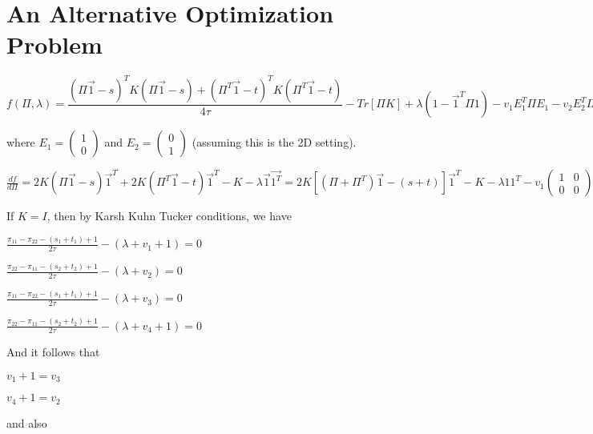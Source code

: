 \section{An Alternative Optimization Problem}
$f(\Pi,\lambda)=\dfrac{(\Pi\vec{1}-s)^{T}K(\Pi\vec{1}-s)+(\Pi^{T}\vec{1}-t)^{T}K(\Pi^{T}\vec{1}-t)}{4\tau}-Tr[\Pi K]+\lambda(1-\vec{1}^{T}\Pi1)-v_{1}E_{1}^{T}\Pi E_{1}-v_{2}E_{2}^{T}\Pi E_{1}-v_{3}E_{1}^{T}\Pi E_{2}-v_{4}E_{2}^{T}\Pi E_{2}$

where $E_{1}=\left(\begin{array}{c}
1\\
0
\end{array}\right)$ and $E_{2}=\left(\begin{array}{c}
0\\
1
\end{array}\right)$ (assuming this is the 2D setting).

$\frac{df}{d\Pi}=2K(\Pi\vec{1}-s)\vec{1}^{T}+2K(\Pi^{T}\vec{1}-t)\vec{1}^{T}-K-\lambda\vec{1}\vec{1^{T}}=2K[(\Pi+\Pi^{T})\vec{1}-(s+t)]\vec{1}^{T}-K-\lambda11^{T}-v_{1}\left(\begin{array}{cc}
1 & 0\\
0 & 0
\end{array}\right)-v_{2}\left(\begin{array}{cc}
0 & 0\\
1 & 0
\end{array}\right)-v_{3}\left(\begin{array}{cc}
0 & 1\\
0 & 0
\end{array}\right)-v_{4}\left(\begin{array}{cc}
0 & 0\\
0 & 1
\end{array}\right)$

If $K=I$, then by Karsh Kuhn Tucker conditions, we have 

$\frac{\pi_{11}-\pi_{22}-(s_{1}+t_{1})+1}{2\tau}-(\lambda+v_{1}+1)=0$

$\frac{\pi_{22}-\pi_{11}-(s_{2}+t_{2})+1}{2\tau}-(\lambda+v_{2})=0$

$\frac{\pi_{11}-\pi_{22}-(s_{1}+t_{1})+1}{2\tau}-(\lambda+v_{3})=0$

$\frac{\pi_{22}-\pi_{11}-(s_{2}+t_{2})+1}{2\tau}-(\lambda+v_{4}+1)=0$

And it follows that

$v_{1}+1=v_{3}$

$v_{4}+1=v_{2}$

and also

